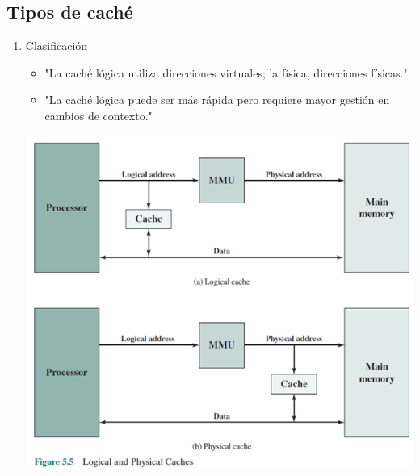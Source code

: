 \documentclass[presentation]{beamer}
\begin{document}
\subsection{Tipos de caché}
\label{sec:org7068f7d}
\begin{enumerate}
\item Clasificación
\label{sec:org4ccf07e}
\begin{itemize}
\item "La caché lógica utiliza direcciones virtuales; la física, direcciones físicas."
\item "La caché lógica puede ser más rápida pero requiere mayor gestión en cambios de contexto."
\end{itemize}

\begin{center}
\includegraphics[width=.9\linewidth]{./Imagenes/fig5.png}
\end{center}
\end{enumerate}
\end{document}
